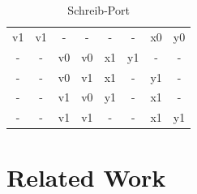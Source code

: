 \begin{table}
{\begin{minipage}{\textwidth}
\begin{tabular}{cccccccc}
			\multicolumn{1}{c}{v1} & \multicolumn{1}{c}{v1} &
			\multicolumn{1}{c}{-} & \multicolumn{1}{c}{-} &
			\multicolumn{1}{|c}{-} & \multicolumn{1}{c}{-} & \multicolumn{1}{c}{x0} &  \multicolumn{1}{c}{y0} \\
			\multicolumn{1}{c}{-} & \multicolumn{1}{c}{-} &
			\multicolumn{1}{c}{v0} & \multicolumn{1}{c}{v0} &
			\multicolumn{1}{|c}{x1} & \multicolumn{1}{c}{y1} & \multicolumn{1}{c}{-} & \multicolumn{1}{c}{-} \\ 
			\multicolumn{1}{c}{-} & \multicolumn{1}{c}{-} &
			\multicolumn{1}{c}{v0} & \multicolumn{1}{c}{v1} &
			\multicolumn{1}{|c}{x1} & \multicolumn{1}{c}{-} & \multicolumn{1}{c}{y1} & \multicolumn{1}{c}{-} \\ 
			\multicolumn{1}{c}{-} & \multicolumn{1}{c}{-} &
			\multicolumn{1}{c}{v1} & \multicolumn{1}{c}{v0} &
			\multicolumn{1}{|c}{y1} & \multicolumn{1}{c}{-} & \multicolumn{1}{c}{x1} & \multicolumn{1}{c}{-} \\ 
			\multicolumn{1}{c}{-} & \multicolumn{1}{c}{-} &
			\multicolumn{1}{c}{v1} & \multicolumn{1}{c}{v1} &
			\multicolumn{1}{|c}{-} & \multicolumn{1}{c}{-} & \multicolumn{1}{c}{x1} &  \multicolumn{1}{c}{y1} \\               
		\end{tabular}
		\caption{\label{fig::schreib-port}Schreib-Port}
	\end{minipage}}
\end{table}

\newpage
\section{Related Work}

